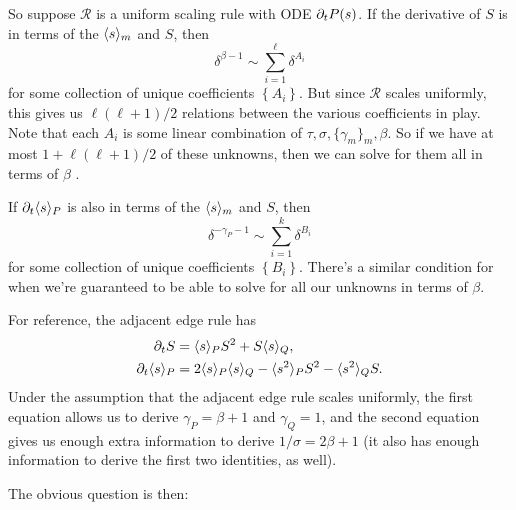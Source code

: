 \documentclass[twoside,10pt]{article}
\begin{document}
So suppose $\mathcal{R}$ is a uniform scaling rule with ODE $\partial_{t}{P}(s) $. If the derivative of $S$ is in terms of the $\langle s \rangle_{m}$ and $S$, then
\[
	\delta^{\beta-1} \sim \sum_{i=1}^{\ell} \delta^{A_i}
\] for some collection of unique coefficients $\left\{ A_i \right\}$. But since $\mathcal{R}$ scales uniformly, this gives us $\ell(\ell+1)/2$ relations between the various coefficients in play. Note that each $A_i$ is some linear combination of $\tau, \sigma, \{\gamma_{m}\}_m, \beta$. So if we have at most $1 + \ell(\ell+1)/2$ of these unknowns, then we can solve for them all in terms of $\beta$ .

If $\partial_{t}{\langle s \rangle_{P}} $ is also in terms of the $\langle s \rangle_{m}$ and $S$, then
\[
\delta^{-\gamma_{P}-1} \sim \sum_{i=1}^{k} \delta^{B_{i}}
\] for some collection of unique coefficients $\left\{ B_i \right\}$. There's a similar condition for when we're guaranteed to be able to solve for all our unknowns in terms of $\beta$.

\begin{ex}
For reference, the adjacent edge rule has
\begin{align*}
	\partial_{t}{S} &= \langle s \rangle_{P}S^2 + S\langle s \rangle_{Q}, \\
	\partial_{t}{\langle s \rangle_{P}} &= 2\langle s \rangle_{P}\langle s \rangle_{Q} - \langle s^2 \rangle_{P}S^2 - \langle s^2 \rangle_{Q}S.
\end{align*}
Under the assumption that the adjacent edge rule scales uniformly, the first equation allows us to derive $\gamma_{P}=\beta+1$ and $\gamma_{Q}=1$, and the second equation gives us enough extra information to derive $1/\sigma = 2\beta+1$ (it also has enough information to derive the first two identities, as well).
\end{ex}

The obvious question is then: 
\end{document}
